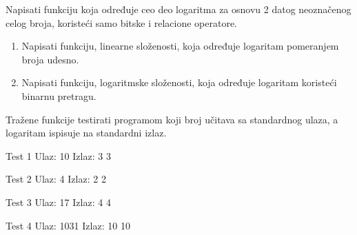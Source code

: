 \begin{Answer}[ref=408]
\end{Answer}
\begin{Exercise}[label=409]
  Napisati funkciju koja određuje ceo deo logaritma za osnovu 2 datog
  neoznačenog celog broja, koristeći samo bitske i relacione
  operatore.
  \begin{enumerate}
  \item Napisati funkciju, linearne složenosti, koja određuje
    logaritam pomeranjem broja udesno.
  \item Napisati funkciju, logaritmske složenosti, koja određuje
    logaritam koristeći binarnu pretragu.
  \end{enumerate}
  Tražene funkcije testirati programom koji broj učitava sa
  standardnog ulaza, a logaritam ispisuje na standardni izlaz.
  
\begin{minitest}
\begin{test}{Test 1}
Ulaz:  10
Izlaz: 3 3
\end{test}
\end{minitest}
\begin{minitest}
\begin{test}{Test 2}
Ulaz:  4
Izlaz: 2 2
\end{test}
\end{minitest}
\begin{minitest}
\begin{test}{Test 3}
Ulaz:  17
Izlaz: 4 4
\end{test}
\end{minitest}

\begin{minitest}
\begin{test}{Test 4}
Ulaz:  1031
Izlaz: 10 10
\end{test}
\end{minitest}


\end{Exercise}

